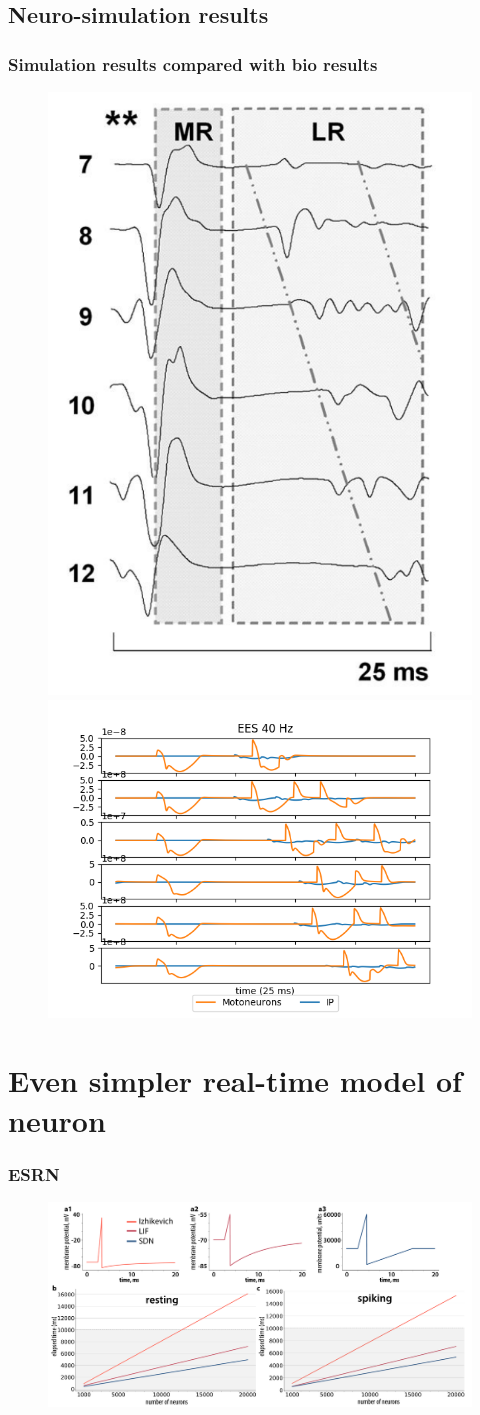 \documentclass[12pt, aspectratio=169]{beamer}
\begin{document}
\subsection{Neuro-simulation results}
\begin{frame}
  \frametitle{Simulation results compared with bio results}
  \begin{figure}
    \includegraphics[width=0.2725\linewidth]{mscs_biological_results}
    \includegraphics[width=0.60\linewidth]{cpg_40Hz_100p}
  \end{figure}
\end{frame}


\section{Even simpler real-time model of neuron}
\begin{frame}
  \frametitle{ESRN}
  \begin{figure}
    \includegraphics[width=0.8\linewidth]{states}
  \end{figure}
\end{frame}
\end{document}

